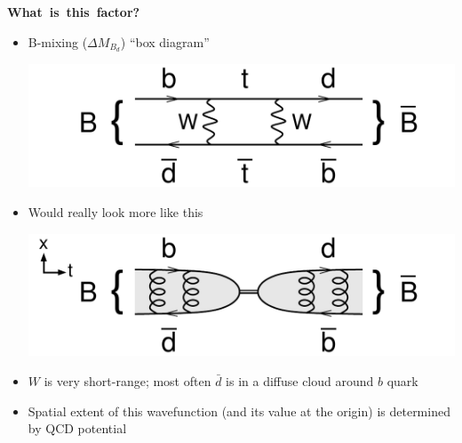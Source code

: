 \documentclass[landscape]{article}
\newenvironment{slide}[1][ ]{\mbox{\bf \boldmath #1 } \vfill}{\vfill \vspace{-1.5 cm} \mbox{ } \pagebreak}
\newenvironment{itemizer}[1]{\begin{itemize}\setlength{\itemsep}{#1}}{\end{itemize}}
\begin{document}
\begin{slide}[What is this factor?]

\begin{itemizer}{1.5 cm}

  \item \begin{minipage}{0.5\linewidth} B-mixing ($\Delta M_{B_d}$) ``box diagram'' \end{minipage} \hfill \begin{minipage}{12 cm} \includegraphics[width=\linewidth]{diagram_Bmix_box} \end{minipage}

  \item \begin{minipage}{0.5\linewidth} Would really look more like this \end{minipage} \hfill \begin{minipage}{12 cm} \includegraphics[width=\linewidth]{diagram_Bmix} \end{minipage}

  \item $W$ is very short-range; most often $\bar{d}$ is in a diffuse cloud around $b$ quark

  \item Spatial extent of this wavefunction (and its value at the origin) is \mbox{determined} by QCD potential

\end{itemizer}

\end{slide}
\end{document}
